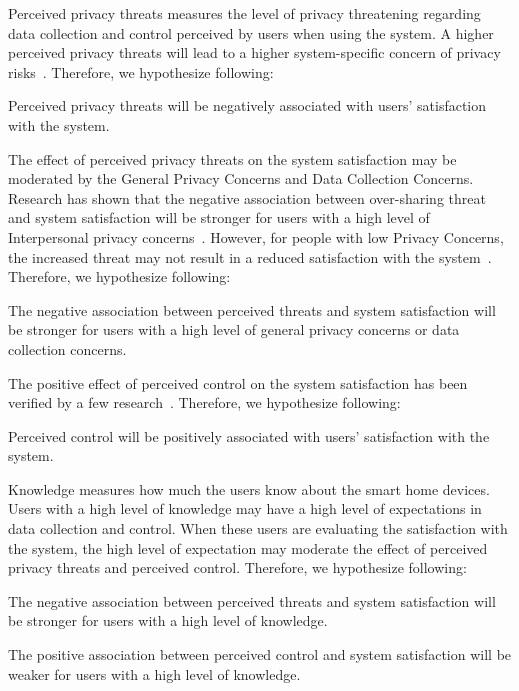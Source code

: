 Perceived privacy threats measures the level of privacy threatening regarding data collection and control perceived by users when using the system. A higher perceived privacy threats will lead to a higher system-specific concern of privacy risks~\cite{knijnenburg2013persuasive, knijnenburg2014increasing}. Therefore, we hypothesize following:
\theoremgroup
\begin{theorem}
	Perceived privacy threats will be negatively associated with users' satisfaction with the system.
\end{theorem}

The effect of perceived privacy threats on the system satisfaction may be moderated by the General Privacy Concerns and Data Collection Concerns. Research has shown that the negative association between over-sharing threat and system satisfaction will be stronger for users with a high level of Interpersonal privacy concerns~\cite{knijnenburg2014increasing}. However, for people with low Privacy  Concerns, the increased threat may not result in a reduced satisfaction with the system~\cite{hann2007overcoming, krasnova2009investigating}. Therefore, we hypothesize following:
\begin{theorem}
	The negative association between perceived threats and system satisfaction will be stronger for users with a high level of general privacy concerns or data collection concerns.
\end{theorem}

The positive effect of perceived control on the system satisfaction has been verified by a few research~\cite{malhotra2004internet, madejski2012study}. Therefore, we hypothesize following:
\begin{theorem}
	Perceived control will be positively associated with users' satisfaction with the system.
\end{theorem}

Knowledge measures how much the users know about the smart home devices. Users with a high level of knowledge may have a high level of expectations in data collection and control. When these users are evaluating the satisfaction with the system, the high level of expectation may moderate the effect of perceived privacy threats and perceived control. Therefore, we hypothesize following:
\theoremgroup
\begin{theorem}
	The negative association between perceived threats and system satisfaction will be stronger for users with a high level of knowledge.
\end{theorem}
\begin{theorem}
	The positive association between perceived control and system satisfaction will be weaker for users with a high level of knowledge.
\end{theorem}

